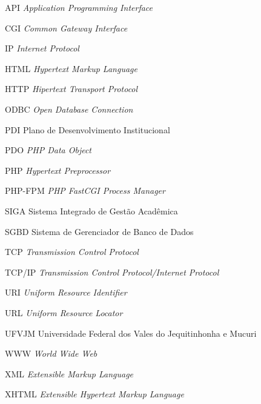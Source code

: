 \begin{siglas}
  \item[API] \textit{Application Programming Interface}
  \item[CGI] \textit{Common Gateway Interface}
  \item[IP] \textit{Internet Protocol}
  \item[HTML] \textit{Hypertext Markup Language}
  \item[HTTP] \textit{Hipertext Transport Protocol}
  \item[ODBC] \textit{Open Database Connection}
  \item[PDI] Plano de Desenvolvimento Institucional
  \item[PDO] \textit{PHP Data Object}
  \item[PHP] \textit{Hypertext Preprocessor}
  \item[PHP-FPM] \textit{PHP FastCGI Process Manager}
  \item[SIGA] Sistema Integrado de Gestão Acadêmica
  \item[SGBD] Sistema de Gerenciador de Banco de Dados
  \item[TCP] \textit{Transmission Control Protocol}
  \item[TCP/IP] \textit{Transmission Control Protocol/Internet Protocol	}
  \item[URI] \textit{Uniform Resource Identifier}
  \item[URL] \textit{Uniform Resource Locator}
  \item[UFVJM] Universidade Federal dos Vales do Jequitinhonha e Mucuri
  \item[WWW] \textit{World Wide Web}
  \item[XML] \textit{Extensible Markup Language}
  \item[XHTML] \textit{Extensible Hypertext Markup Language}
\end{siglas}